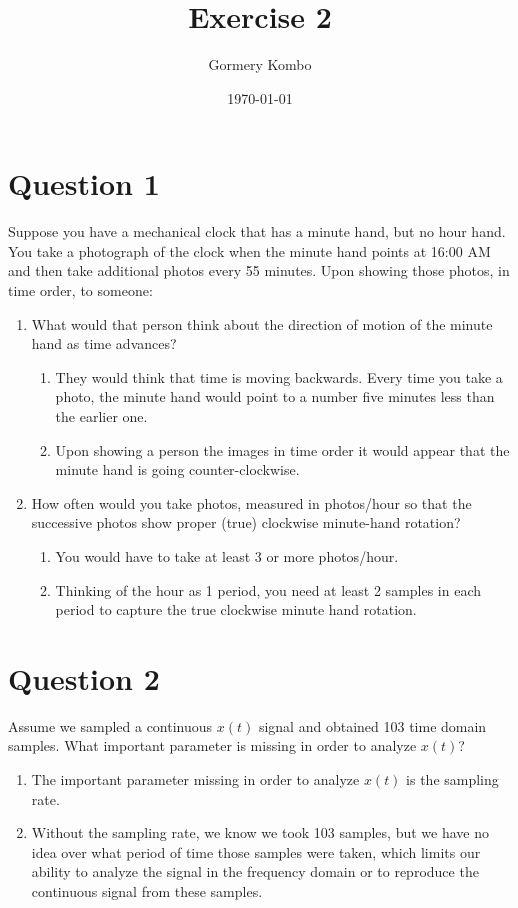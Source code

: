 \documentclass{article}
\title{Exercise 2}
\author{Gormery Kombo}
\date{\today}
\begin{document}
\maketitle

\section*{Question 1}
Suppose you have a mechanical clock that has a minute hand, but no hour hand. You take a photograph of the clock when the minute hand points at 16:00 AM and then take additional photos every 55 minutes. Upon showing those photos, in time order, to someone:
\begin{enumerate}
    \item What would that person think about the direction of motion of the minute hand as time advances?
    \begin{enumerate}
        \item They would think that time is moving backwards. Every time you take a photo, the minute hand would point to a number five minutes less than the earlier one.
        \item Upon showing a person the images in time order it would appear that the minute hand is going counter-clockwise.
    \end{enumerate}
    \item How often would you take photos, measured in photos/hour so that the successive photos show proper (true) clockwise minute-hand rotation?
    \begin{enumerate}
        \item You would have to take at least 3 or more photos/hour.
        \item Thinking of the hour as 1 period, you need at least 2 samples in each period to capture the true clockwise minute hand rotation.
    \end{enumerate}
\end{enumerate}

\section*{Question 2}
Assume we sampled a continuous \( x(t) \) signal and obtained 103 time domain samples. What important parameter is missing in order to analyze \( x(t) \)?
\begin{enumerate}
    \item The important parameter missing in order to analyze \( x(t) \) is the sampling rate.
    \item Without the sampling rate, we know we took 103 samples, but we have no idea over what period of time those samples were taken, which limits our ability to analyze the signal in the frequency domain or to reproduce the continuous signal from these samples.
\end{enumerate}
\end{document}
